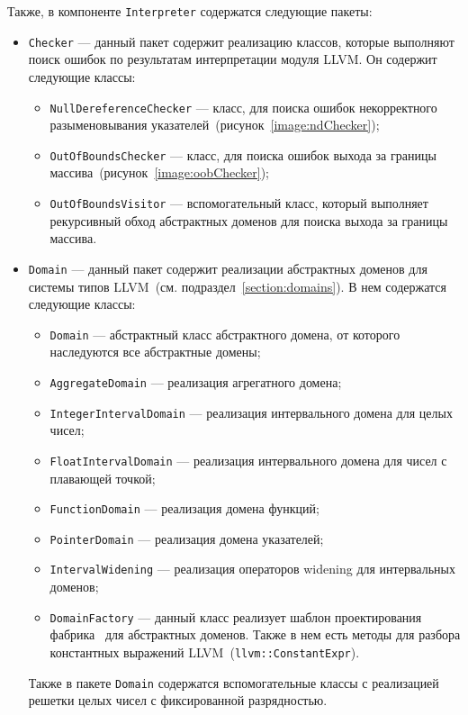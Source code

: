 Также, в компоненте \texttt{Interpreter} содержатся следующие пакеты:
\begin{itemize}
\item \texttt{Checker} --- данный пакет содержит реализацию классов, которые 
выполняют поиск ошибок по результатам интерпретации модуля LLVM. Он содержит 
следующие классы:
    \begin{itemize}
    \item \texttt{NullDereferenceChecker} --- класс, для поиска ошибок 
    некорректного разыменовывания указателей~(рисунок~\ref{image:ndChecker});
    \item \texttt{OutOfBoundsChecker} --- класс, для поиска ошибок выхода за 
    границы массива~(рисунок~\ref{image:oobChecker});
    \item \texttt{OutOfBoundsVisitor} --- вспомогательный класс, который 
    выполняет рекурсивный обход абстрактных доменов для поиска выхода за границы
    массива.
    \end{itemize}
\item \texttt{Domain} --- данный пакет содержит реализации абстрактных доменов для системы типов LLVM~(см. подраздел~\ref{section:domains}). В нем содержатся 
следующие классы:
    \begin{itemize}
    \item \texttt{Domain} --- абстрактный класс абстрактного домена, от которого
    наследуются все абстрактные домены;
    \item \texttt{AggregateDomain} --- реализация агрегатного домена;
    \item \texttt{IntegerIntervalDomain} --- реализация интервального домена для 
    целых чисел;
    \item \texttt{FloatIntervalDomain} --- реализация интервального домена для 
    чисел с плавающей точкой;
    \item \texttt{FunctionDomain} --- реализация домена функций;
    \item \texttt{PointerDomain} --- реализация домена указателей;
    \item \texttt{IntervalWidening} --- реализация операторов widening для 
    интервальных доменов;
    \item \texttt{DomainFactory} --- данный класс реализует шаблон 
    проектирования фабрика~\cite{factory} для абстрактных доменов. Также в нем 
    есть методы для разбора константных выражений 
    LLVM~(\texttt{llvm::ConstantExpr}).
    \end{itemize}

    Также в пакете \texttt{Domain} содержатся вспомогательные классы с 
    реализацией решетки целых чисел с фиксированной разрядностью.


\end{itemize}

